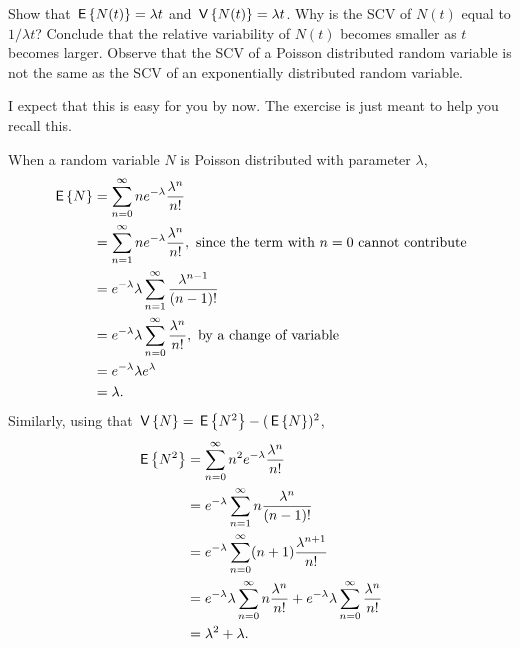\begin{question}
  Show that $\,\mathsf{E}\left\{N(t)\right\} = \lambda t$ and $\,\mathsf{V}\left\{N(t)\right\} = \lambda t$. Why is
  the SCV of $N(t)$ equal to $1/\lambda t$? Conclude that the relative
  variability of $N(t)$ becomes smaller as $t$ becomes larger. Observe
  that the SCV of a Poisson distributed random variable is not the
  same as the SCV of an exponentially distributed random variable.

  \begin{hint}
  \end{hint}

  \begin{solution} I expect that this is easy for you by now. The
    exercise is just meant to help you recall this.

    When a random variable $N$ is Poisson distributed with parameter
    $\lambda$,
    \begin{equation*}
      \begin{split}
      \,\mathsf{E}\left\{N\right\} 
&= \sum_{n=0}^\infty n e^{-\lambda}\frac{\lambda^n}{n!}  \\
&= \sum_{n=1}^\infty n e^{-\lambda}\frac{\lambda^n}{n!}, \text{ since the term with $n=0$ cannot contribute} \\
&= e^{-\lambda} \lambda \sum_{n=1}^\infty \frac{\lambda^{n-1}}{(n-1)!} \\
&= e^{-\lambda} \lambda \sum_{n=0}^\infty \frac{\lambda^{n}}{n!}, \text{ by a change of variable}\\
&= e^{-\lambda} \lambda e^{\lambda} \\
&= \lambda.
      \end{split}
    \end{equation*}
Similarly, using that $\,\mathsf{V}\left\{N\right\} = \,\mathsf{E}\left\{N^2\right\} - (\,\mathsf{E}\left\{N\right\})^2$, 
    \begin{equation*}
      \begin{split}
      \,\mathsf{E}\left\{N^2\right\}
&= \sum_{n=0}^\infty n^2 e^{-\lambda}\frac{\lambda^n}{n!}  \\
&= e^{-\lambda} \sum_{n=1}^\infty n \frac{\lambda^n}{(n-1)!}  \\
&= e^{-\lambda} \sum_{n=0}^\infty (n+1) \frac{\lambda^{n+1}}{n!}  \\
&= e^{-\lambda} \lambda \sum_{n=0}^\infty n \frac{\lambda^{n}}{n!}  +e^{-\lambda}\lambda \sum_{n=0}^\infty\frac{\lambda^{n}}{n!}  \\
&= \lambda^2  + \lambda.
\end{split}
\end{equation*}


\end{solution}
\end{question}
